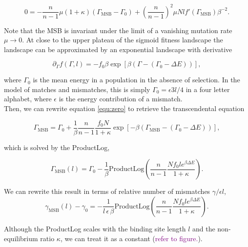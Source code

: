 \documentclass[10pt,a4paper]{article}
\newcommand{\purple}[1]{\textcolor{purple}{#1}}
\newcommand{\productlog}{\mathrm{ProductLog}}
\begin{document}
\begin{equation}
	0=-\frac{n}{n-1}\mu\left(1+\kappa\right)\left(\Gamma_{\mathrm{MSB}}-\Gamma_0\right)+\left(\frac{n}{n-1}\right)^2\mu N l f'(\Gamma_{\mathrm{MSB}})\beta^{-2}.
	\label{equ:zero}
\end{equation}

\noindent Note that the MSB is invariant under the limit of a vanishing mutation rate $\mu\rightarrow0$. At close to the upper plateau of the sigmoid fitness 
landscape the landscape can be approximated by an exponential landscape with derivative

\begin{equation}
\partial_\Gamma f(\Gamma, l) = -f_0\beta\exp\left[ \beta (\Gamma- (\Gamma_0-\Delta E ))\right],
\end{equation}

\noindent where $\Gamma_0$ is the mean energy in a population in the absence of selection. In the model of matches and mismatches, this is simply 
$\Gamma_0=\epsilon 3l/4$ in a four letter alphabet, where $\epsilon$ is the energy contribution of a mismatch.\\
Then, we can rewrite equation \ref{equ:zero} to retrieve the transcendental equation

\begin{equation}
	\Gamma_\mathrm{MSB}=\Gamma_0+\frac{1}{\beta}\frac{n}{n-1}\frac{f_0 N}{1+\kappa}\exp\left[-\beta (\Gamma_\mathrm{MSB} -(\Gamma_0-\Delta E) )\right],
\end{equation}

\noindent which is solved by the ProductLog,

\begin{equation}
	\Gamma_\mathrm{MSB}(l)=\Gamma_0 - \frac{1}{\beta}\productlog\left(\frac{n}{n-1}\frac{ N f_0 l e^{\beta\Delta E}}{1+\kappa}\right)\label{equ:msb_solution}.
\end{equation}

\noindent We can rewrite this result in terms of relative number of mismatches $\gamma/\epsilon l$,
\begin{equation}
\gamma_\mathrm{MSB}(l) - \gamma_0= -\frac{1}{l\,\epsilon\,\beta} \productlog \left(\frac{n}{n-1}\frac{ N f_0 l e^{\beta\Delta E}}{1+\kappa}\right). \label{equ:intensive_scaling}
\end{equation}

\noindent Although the ProductLog scales with the binding site length $l$ and the non-equilibrium ratio $\kappa$, we can treat it as a constant (\purple{refer to figure.}).
\end{document}

